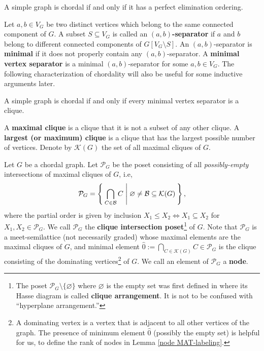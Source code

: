 \documentclass[ALCO, Unicode,published]{cedram}
\newcommand{\mcK}{\mathcal{K}}
\begin{document}
\begin{theorem}
  \label{thm:chordal-PEO}
A simple graph is chordal if and only if it has a perfect elimination ordering. 
\end{theorem}


Let $ a,b \in V_{G} $ be two distinct vertices which belong to the same connected component of $ G $. 
A subset $ S \subseteq V_{G} $ is called an \textbf{$ (a,b) $-separator} if $ a $ and $ b $ belong to different connected components of $ G[V_{G}\setminus S] $. 
An $ (a,b) $-separator is \textbf{minimal} if it does not properly contain any $ (a,b) $-separator. 
A \textbf{minimal vertex separator} is a minimal $ (a,b) $-separator for some $ a,b \in V_{G} $. 
The following characterization of chordality will also be useful for some inductive arguments later. 
\begin{theorem}\label{Dirac minimal vertex separator}
A simple graph is chordal if and only if every minimal vertex separator is a clique. 
\end{theorem}

A \textbf{maximal clique} is a clique that it is not a subset of any other clique. 
A \textbf{largest (or maximum) clique} is a clique that has the largest possible number of vertices. 
Denote by $\mcK(G)$ the set of all maximal cliques of $G$.

Let $G$ be a chordal graph. 
Let $ \mathcal{P}_{G} $ be the poset consisting of  all \emph{possibly-empty} intersections of maximal cliques of $ G $, i.e, 
$$
 \mathcal{P}_{G} = \Set{\bigcap_{C \in \mathcal{B}}C  |   \varnothing \ne \mathcal{B} \subseteq \mcK(G) },
$$
where the partial order is given by inclusion $X_1\le X_2\Leftrightarrow X_1\subseteq X_2$ for $X_1, X_2 \in \mathcal{P}_{G}$. 
We call $ \mathcal{P}_{G} $ the \textbf{clique intersection poset}\footnote{The poset $ \mathcal{P}_{G}  \setminus \{\varnothing\}$ where  $\varnothing$ is the empty set was first defined in \cite{nevries2015characterizing-dam} where its Hasse diagram is called \textbf{clique arrangement}. It is not to be confused with ``hyperplane arrangement.''}
 of $ G $. 
Note that $ \mathcal{P}_{G} $  is a meet-semilattice (not necessarily graded) whose maximal elements are the maximal cliques of $G$, and minimal element $ \hat{0}:=\bigcap_{C \in \mcK(G) }C \in  \mathcal{P}_{G} $ is the clique consisting of the dominating vertices\footnote{A dominating vertex is a  vertex that is adjacent to all other vertices of the graph. The presence of minimum  element $ \hat{0}$  (possibly the empty set) is helpful for us, \eg  to define the rank of nodes in Lemma \ref{node MAT-labeling}.}
of $ G $.
We call an element of $ \mathcal{P}_{G} $ a \textbf{node}. 
\end{document}
